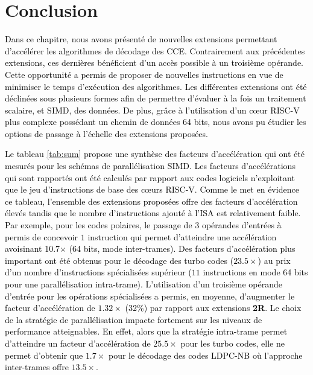 \documentclass[../main.tex]{subfiles}
\begin{document}
\section{Conclusion}
%
%
%
%
\textcolor{black}{Dans ce chapitre, nous avons présenté de nouvelles extensions permettant d'accélérer les algorithmes de décodage des CCE. 
Contrairement aux précédentes extensions, ces dernières bénéficient d'un accès possible à un troisième opérande. 
Cette opportunité a permis de proposer de nouvelles instructions en vue de minimiser le temps d'exécution des algorithmes. 
Les différentes extensions ont été déclinées sous plusieurs formes afin de permettre d'évaluer à la fois un traitement scalaire, et SIMD, des données. 
De plus, grâce à l'utilisation d'un cœur RISC-V plus complexe possédant un chemin de données 64 bits, nous avons pu étudier les options de passage à l'échelle des extensions proposées.}

\textcolor{black}{Le tableau \ref{tab:sum} propose une synthèse des facteurs d'accélération qui ont été mesurés pour les schémas de parallélisation SIMD. 
Les facteurs d'accélérations qui sont rapportés ont été calculés par rapport aux codes logiciels n'exploitant que le jeu d'instructions de base des cœurs RISC-V. 
Comme le met en évidence ce tableau, l'ensemble des extensions proposées offre des facteurs d'accélération élevés tandis que le nombre d'instructions ajouté à l'ISA est relativement faible. 
Par exemple, pour les codes polaires, le passage de $3$ opérandes d'entrées à permis de concevoir $1$ instruction qui permet d'atteindre une accélération avoisinant 10.7$\times$ (64 bits, mode inter-trames). 
Des facteurs d'accélération plus important ont été obtenus pour le décodage des turbo codes ($23.5\times$) au prix d'un nombre d'instructions spécialisées supérieur ($11$ instructions en mode 64 bits pour une parallélisation intra-trame). 
L'utilisation d'un troisième opérande d'entrée pour les opérations spécialisées a permis, en moyenne, d'augmenter le facteur d'accélération de $1.32\times$ (32\%) par rapport aux extensions \textbf{2R}.
Le choix de la stratégie de parallélisation impacte fortement sur les niveaux de performance atteignables. 
En effet, alors que la stratégie intra-trame permet d'atteindre un facteur d'accélération de $25.5\times$ pour les turbo codes, elle ne permet d'obtenir que $1.7\times$ pour le décodage des codes LDPC-NB où l'approche inter-trames offre $13.5\times$.}
\end{document}
